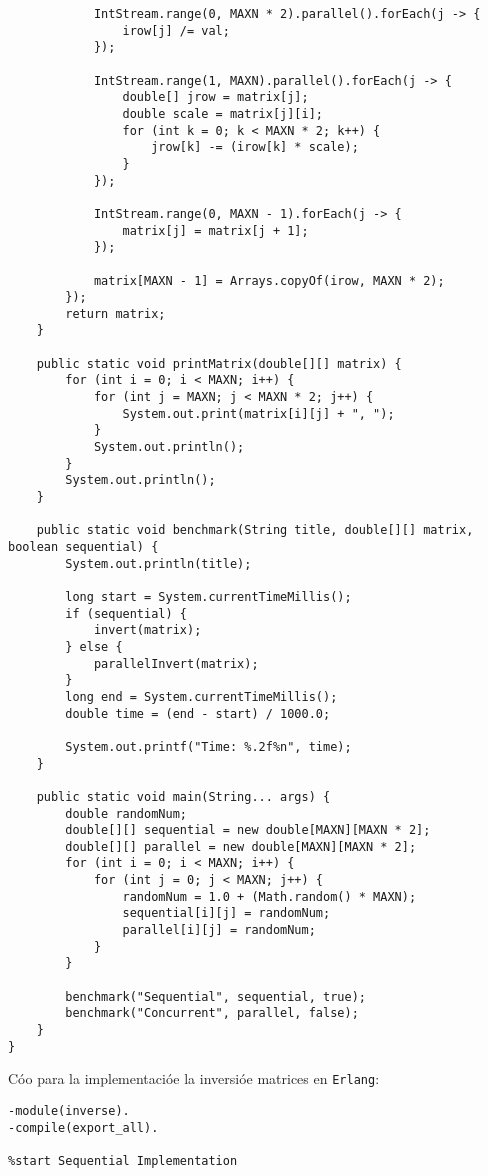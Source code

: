 \documentclass[10pt,letterpaper,oneside]{article}
\begin{document}
{\begin{verbatim}
            IntStream.range(0, MAXN * 2).parallel().forEach(j -> {
                irow[j] /= val;
            });

            IntStream.range(1, MAXN).parallel().forEach(j -> {
                double[] jrow = matrix[j];
                double scale = matrix[j][i];
                for (int k = 0; k < MAXN * 2; k++) {
                    jrow[k] -= (irow[k] * scale);
                }
            });

            IntStream.range(0, MAXN - 1).forEach(j -> {
                matrix[j] = matrix[j + 1];
            });

            matrix[MAXN - 1] = Arrays.copyOf(irow, MAXN * 2);
        });
        return matrix;
    }

    public static void printMatrix(double[][] matrix) {
        for (int i = 0; i < MAXN; i++) {
            for (int j = MAXN; j < MAXN * 2; j++) {
                System.out.print(matrix[i][j] + ", ");
            }
            System.out.println();
        }
        System.out.println();
    }

    public static void benchmark(String title, double[][] matrix, boolean sequential) {
        System.out.println(title);

        long start = System.currentTimeMillis();
        if (sequential) {
            invert(matrix);
        } else {
            parallelInvert(matrix);
        }
        long end = System.currentTimeMillis();
        double time = (end - start) / 1000.0;

        System.out.printf("Time: %.2f%n", time);
    }

    public static void main(String... args) {
        double randomNum;
        double[][] sequential = new double[MAXN][MAXN * 2];
        double[][] parallel = new double[MAXN][MAXN * 2];
        for (int i = 0; i < MAXN; i++) {
            for (int j = 0; j < MAXN; j++) {
                randomNum = 1.0 + (Math.random() * MAXN);
                sequential[i][j] = randomNum;
                parallel[i][j] = randomNum;
            }
        }

        benchmark("Sequential", sequential, true);
        benchmark("Concurrent", parallel, false);
    }
}
\end{verbatim}

Cóo para la implementacióe la inversióe matrices en \verb!Erlang!:
\begin{verbatim}
-module(inverse).
-compile(export_all).

%start Sequential Implementation


\end{verbatim}}
\end{document}
